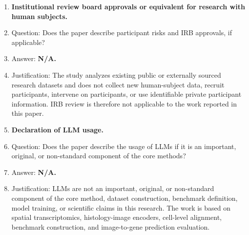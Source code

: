 \documentclass{article}
\begin{document}
\begin{enumerate}[leftmargin=*]
\item \textbf{Institutional review board approvals or equivalent for research with human subjects.}
    \item[] Question: Does the paper describe participant risks and IRB approvals, if applicable?
    \item[] Answer: \textbf{N/A.}
    \item[] Justification: The study analyzes existing public or externally sourced research datasets and does not collect new human-subject data, recruit participants, intervene on participants, or use identifiable private participant information. IRB review is therefore not applicable to the work reported in this paper.

\item \textbf{Declaration of LLM usage.}
    \item[] Question: Does the paper describe the usage of LLMs if it is an important, original, or non-standard component of the core methods?
    \item[] Answer: \textbf{N/A.}
    \item[] Justification: LLMs are not an important, original, or non-standard component of the core method, dataset construction, benchmark definition, model training, or scientific claims in this research. The work is based on spatial transcriptomics, histology-image encoders, cell-level alignment, benchmark construction, and image-to-gene prediction evaluation.

\end{enumerate}
\end{document}
